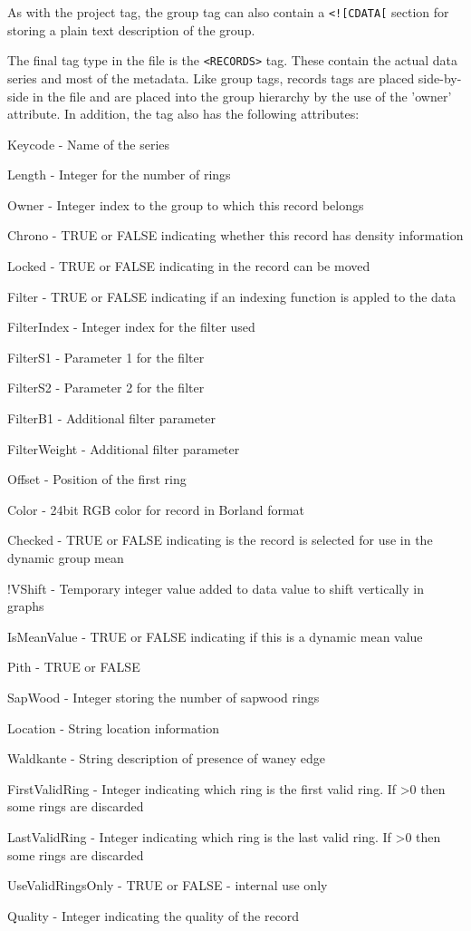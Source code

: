 \documentclass[10pt, headsepline,DIV14,BCOR0.5cm]{scrreprt}
\begin{document}
As with the project tag, the group tag can also contain a \verb|<![CDATA[| section for storing a plain text description of the group.

The final tag type in the file is the \verb|<RECORDS>| tag. These contain the actual data series and most of the metadata. Like group tags, records tags are placed side-by-side in the file and are placed into the group hierarchy by the use of the 'owner' attribute. In addition, the tag also has the following attributes:

\begin{itemize*}
    \item  Keycode - Name of the series
    \item  Length - Integer for the number of rings
    \item  Owner - Integer index to the group to which this record belongs
    \item  Chrono - TRUE or FALSE indicating whether this record has density information
    \item  Locked - TRUE or FALSE indicating in the record can be moved
    \item  Filter - TRUE or FALSE indicating if an indexing function is appled to the data
    \item  FilterIndex - Integer index for the filter used
    \item  FilterS1 - Parameter 1 for the filter
    \item  FilterS2 - Parameter 2 for the filter
    \item  FilterB1 - Additional filter parameter
    \item  FilterWeight - Additional filter parameter
    \item  Offset - Position of the first ring
    \item  Color - 24bit RGB color for record in Borland format
    \item  Checked - TRUE or FALSE indicating is the record is selected for use in the dynamic group mean
    \item  !VShift - Temporary integer value added to data value to shift vertically in graphs
    \item  IsMeanValue - TRUE or FALSE indicating if this is a dynamic mean value
    \item  Pith - TRUE or FALSE
    \item  SapWood - Integer storing the number of sapwood rings
    \item  Location - String location information
    \item  Waldkante - String description of presence of waney edge
    \item  FirstValidRing - Integer indicating which ring is the first valid ring. If >0 then some rings are discarded
    \item  LastValidRing - Integer indicating which ring is the last valid ring. If >0 then some rings are discarded
    \item  UseValidRingsOnly - TRUE or FALSE - internal use only
    \item  Quality - Integer indicating the quality of the record 
\end{itemize*}
\end{document}
